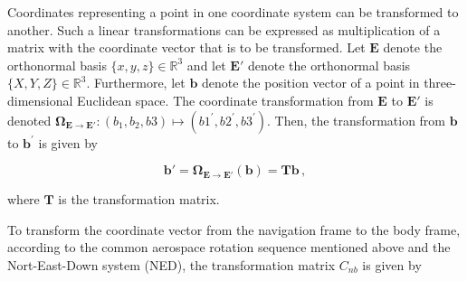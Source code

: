 Coordinates representing a point in one coordinate system can be transformed to another. Such a linear transformations can be expressed as multiplication of a matrix with the coordinate vector that is to be transformed. Let $\mathbf{E}$ denote the orthonormal basis $\{x, y, z\} \in \mathbb{R}^3$ and let $\mathbf{E}'$ denote the orthonormal basis $\{X, Y, Z\} \in \mathbb{R}^3$. Furthermore, let $\mathbf{b}$ denote the position vector of a point in three-dimensional Euclidean space. The coordinate transformation from $\mathbf{E}$ to $\mathbf{E}'$ is denoted $\bm{\Omega}_{\mathbf{E} \rightarrow \mathbf{E}'}: (b_1, b_2, b3) \mapsto (b1^{'}, b2^{'}, b3^{'})$. Then, the transformation from $\mathbf{b}$ to $\mathbf{b}^{'}$ is given by

\begin{equation}\label{eq:transformation}
  \mathbf{b'} = \bm{\Omega}_{\mathbf{E} \rightarrow \mathbf{E}'}(\mathbf{b}) = \mathbf{T} \mathbf{b}\,,
\end{equation}

\noindent
where $\mathbf{T}$ is the transformation matrix.

To transform the coordinate vector from the navigation frame to the body frame, according to the common aerospace rotation sequence mentioned above and the Nort-East-Down system (NED), the transformation matrix $C_{nb}$ is given by

